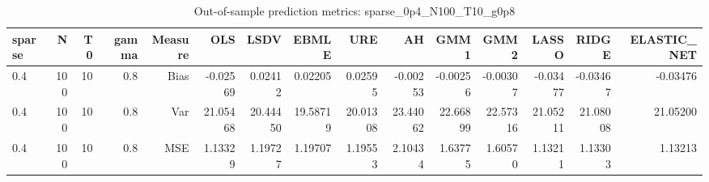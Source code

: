 \begin{table}[!htbp]\centering
\caption{Out-of-sample prediction metrics: sparse_0p4_N100_T10_g0p8}
\label{tab:table3_sparse_0p4_N100_T10_g0p8}
\begin{tabular}{lrrrrrrrrrrrrrr}
\hline
sparse & N & T0 & gamma & Measure & OLS & LSDV & EBMLE & URE & AH & GMM1 & GMM2 & LASSO & RIDGE & ELASTIC_NET \\
\hline
0.4 & 100 & 10 & 0.8 & Bias & -0.02569 & 0.02412 & 0.02205 & 0.02595 & -0.00253 & -0.00256 & -0.00307 & -0.03477 & -0.03467 & -0.03476 \\
0.4 & 100 & 10 & 0.8 & Var & 21.05468 & 20.44450 & 19.58719 & 20.01308 & 23.44062 & 22.66899 & 22.57316 & 21.05211 & 21.08008 & 21.05200 \\
0.4 & 100 & 10 & 0.8 & MSE & 1.13329 & 1.19727 & 1.19707 & 1.19553 & 2.10434 & 1.63775 & 1.60570 & 1.13211 & 1.13303 & 1.13213 \\
\hline
\end{tabular}
\end{table}

